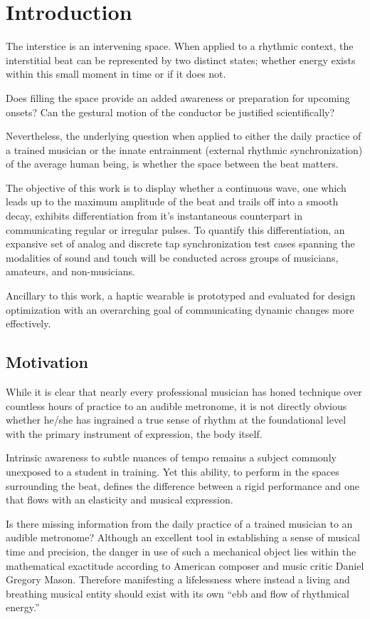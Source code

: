 
\chapter{Introduction} \label{secIntro}
The interstice is an intervening space. When applied to a rhythmic context, the interstitial beat can be represented by two distinct states; whether energy exists within this small moment in time or if it does not. 

Does filling the space provide an added awareness or preparation for upcoming onsets? Can the gestural motion of the conductor be justified scientifically?

Nevertheless, the underlying question when applied to either the daily practice of a trained musician or the innate entrainment (external rhythmic synchronization) of the average human being, is whether the space between the beat matters.

The objective of this work is to display whether a continuous wave, one which leads up to the maximum amplitude of the beat and trails off into a smooth decay, exhibits differentiation from it's instantaneous counterpart in communicating regular or irregular pulses. To quantify this differentiation, an expansive set of analog and discrete tap synchronization test cases spanning the modalities of sound and touch will be conducted across groups of musicians, amateurs, and non-musicians.

Ancillary to this work, a haptic wearable is prototyped and evaluated for design optimization with an overarching goal of communicating dynamic changes more effectively.
\section{Motivation}
While it is clear that nearly every professional musician has honed technique over countless hours of practice to an audible metronome, it is not directly obvious whether he/she has ingrained a true sense of rhythm at the foundational level with the primary instrument of expression, the body itself.

Intrinsic awareness to subtle nuances of tempo remains a subject commonly unexposed to a student in training. Yet this ability, to perform in the spaces surrounding the beat, defines the difference between a rigid performance and one that flows with an elasticity and musical expression.

Is there missing information from the daily practice of a trained musician to an audible metronome? Although an excellent tool in establishing a sense of musical time and precision, the danger in use of such a mechanical object lies within the mathematical exactitude according to American composer and music critic Daniel Gregory Mason. Therefore manifesting a lifelessness where instead a living and breathing musical entity should exist with its own ``ebb and flow of rhythmical energy.''\cite{fitts2008new}

